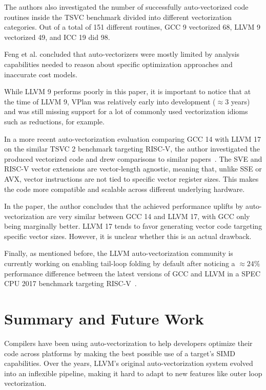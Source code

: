 \documentclass[sigplan,11pt,nonacm]{acmart}
\begin{document}
The authors also investigated the number of successfully auto-vectorized code routines inside the TSVC 
benchmark divided into different vectorization categories. Out of a total of 151 different routines, GCC 9 
vectorized 68, LLVM 9 vectorized 49, and ICC 19 did 98.

Feng et al. concluded that auto-vectorizers were mostly limited by analysis capabilities 
needed to reason about specific optimization approaches and inaccurate cost models.

While LLVM 9 performs poorly in this paper, it is important to notice that at the time of LLVM 9, VPlan was relatively 
early into development ($\approx3$ years) and was still missing 
support for a lot of commonly used vectorization idioms such as reductions, for example.

In a more recent auto-vectorization evaluation comparing GCC 14 with LLVM 17 on the similar TSVC 2 
benchmark targeting RISC-V, the author investigated the produced vectorized code 
and drew comparisons to similar papers~\cite{gccllvmveccomp}. The SVE and RISC-V 
vector extensions are  
vector-length agnostic, 
meaning that, unlike SSE or AVX, vector instructions are not tied to specific vector register sizes. 
This makes the code more compatible and scalable across different underlying hardware. 

In the paper, the author concludes that the achieved performance uplifts by auto-vectorization are very 
similar between GCC 14 and LLVM 17, with GCC only being marginally better. LLVM 17 tends to favor 
generating vector code targeting specific vector sizes. However, it is unclear whether this is an 
actual drawback.

Finally, as mentioned before, the LLVM auto-vectorization community is currently working on 
enabling tail-loop folding by default after noticing a $\approx24\%$ performance difference between the latest 
versions of GCC and LLVM in a SPEC CPU 2017 benchmark targeting RISC-V~\cite{riscvtailfolding}. 




\section{Summary and Future Work}
\label{sec:summary}
Compilers have been using auto-vectorization to help developers optimize their code 
across platforms by making the best possible use of a target's SIMD capabilities. Over the years, 
LLVM's original auto-vectorization system evolved into an inflexible pipeline, making it hard 
to adapt to new features like outer loop vectorization.
\end{document}
